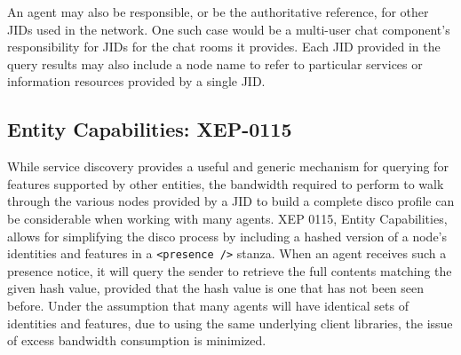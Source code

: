 An agent may also be responsible, or be the authoritative reference, for other
JIDs used in the network. One such case would be a multi-user chat component's
responsibility for JIDs for the chat rooms it provides. Each JID provided in the
query results may also include a node name to refer to particular services or
information resources provided by a single JID.

\subsection{Entity Capabilities: XEP-0115}
\label{sec:Entity-Capabilities}

While service discovery provides a useful and generic mechanism for querying
for features supported by other entities, the bandwidth required to perform
to walk through the various nodes provided by a JID to build a complete disco
profile can be considerable when working with many agents. XEP 0115, Entity
Capabilities, allows for simplifying the disco process by including a hashed
version of a node's identities and features in a \texttt{<presence />} stanza.
When an agent receives such a presence notice, it will query the sender to
retrieve the full contents matching the given hash value, provided that the
hash value is one that has not been seen before. Under the assumption that many
agents will have identical sets of identities and features, due to using the
same underlying client libraries, the issue of excess bandwidth consumption is
minimized.

